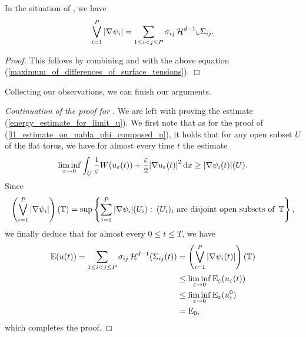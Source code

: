 \begin{proposition}
	\label{supremum_of_abs_nabla_psi_i_is_energy}
	In the situation of , we have
	\begin{equation*}
			\bigvee_{ i = 1 }^{ P }
			\abs{ \nabla \psi_{ i } }
		=
		\sum_{ 1 \leq i < j \leq P }
		 \sigma_{ i j }
		 \operatorname{\mathcal{H}}^{ d - 1 } \llcorner{ \Sigma_{ i j } } .
	\end{equation*}
\end{proposition}

\begin{proof}
	This follows by combining  and  with the above equation (\ref{maximum_of_differences_of_surface_tensions}).
\end{proof}

Collecting our observations, we can finish our arguments.

\begin{proof}[Continuation of the proof for ]
	We are left with proving the estimate (\ref{energy_estimate_for_limit_u}). We first note that as for the proof of (\ref{l1_estimate_on_nabla_phi_composed_u}), it holds that for any open subset $ U $ of the flat torus, we have for almost every time $ t $ the estimate
	\begin{equation*}
		\liminf_{ \varepsilon \to 0 } 
			\int_{ U }
				\frac{ 1 }{ \varepsilon }
				W ( u_{ \varepsilon } ( t )  )
				+
				\frac{ \varepsilon }{ 2 }
				\abs{ \nabla u_{ \varepsilon } ( t ) }^{ 2 }
			\dd{ x }
		\geq
		\abs{ \nabla \psi_{ i } ( t ) } ( U ).
	\end{equation*}
	Since
	\begin{equation*}
		\left(
		\bigvee_{ i = 1 }^{ P }
			\abs{ \nabla \psi_{ i } } 
		\right) 
		( \operatorname{\mathbb{T}} )
		=
		\sup \left\{
			\sum_{ i = 1 }^{ P }
				\abs{ \nabla \psi_{ i } } ( U_{ i } )
			\, \colon \,
			( U_{ i } )_{ i } \text{ are disjoint open subsets of } \operatorname{\mathbb{T}}
		\right\},
	\end{equation*}
	we finally deduce that for almost every $ 0 \leq t \leq T $, we have
	\begin{align*}
		\operatorname{E} ( u ( t ) )
		=
		\sum_{ 1 \leq i < j \leq P }
			\sigma_{ i j }
			\operatorname{\mathcal{H}}^{ d - 1 } ( \Sigma_{ i j } ( t ) )
		& =
		\left(
			\bigvee_{ i = 1 }^{ P }
				\abs{ \nabla \psi_{ i } ( t ) }
		\right) ( \operatorname{\mathbb{T}} )
		\\
		& \leq
		\liminf_{ \varepsilon \to 0 }
			\operatorname{E}_{ \varepsilon } ( u_{ \varepsilon } ( t ) )
		\\
		&\leq
		\liminf_{ \varepsilon \to 0 } 
			\operatorname{E}_{ \varepsilon } ( u_{ \varepsilon }^{ 0 } )
		\\
		& =
		\operatorname{E}_{ 0 },
	\end{align*}
	which completes the proof.
\end{proof}

